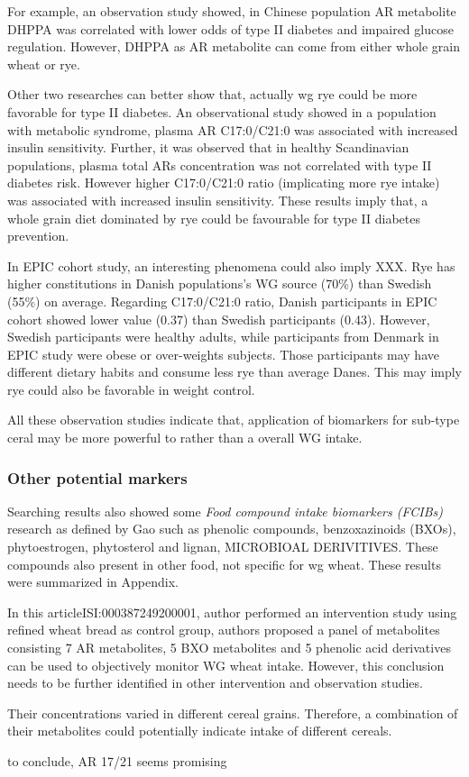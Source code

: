 For example, an observation study showed, in Chinese population AR metabolite DHPPA was correlated with lower odds of type II diabetes and impaired glucose regulation\cite{ISI:000430455900021}. However, DHPPA as AR metabolite can come from either whole grain wheat or rye.

Other two researches can better show that, actually \acrshort{wg} rye could be more favorable for type II diabetes.  An observational study showed in a population with metabolic syndrome, plasma AR C17:0/C21:0 was associated with increased insulin sensitivity\cite{ISI:000333777700008}. Further, it was observed that in healthy Scandinavian populations, plasma total ARs concentration was not correlated with type II diabetes risk. However higher C17:0/C21:0 ratio (implicating more rye intake) was associated with increased insulin sensitivity\cite{ISI:000378977200013}. These results imply that, a whole grain diet dominated by rye could be favourable for type II diabetes prevention. 

In EPIC cohort study, an interesting phenomena could also imply XXX. Rye has higher constitutions in Danish populations's WG source (70\%) than Swedish (55\%) on average. Regarding C17:0/C21:0 ratio, Danish participants in EPIC cohort showed lower value (0.37) than Swedish participants (0.43). 
However, Swedish participants were healthy adults, while participants from Denmark in EPIC study were obese or over-weights subjects. Those participants may have different dietary habits and consume less rye than average Danes. This may imply rye could also be favorable in weight control.

All these observation studies indicate that, application of biomarkers for sub-type ceral may be more powerful to rather than a overall WG intake.

\subsubsection{Other potential markers}
Searching results also showed some \textit{Food compound intake biomarkers (FCIBs)} research as defined by Gao\cite{Gao2017} such as phenolic compounds\cite{ISI:000389134200003}, benzoxazinoids (BXOs)\cite{ISI:000394168100034,ISI:000348343300015}, phytoestrogen\cite{ISI:000384082300001}, phytosterol and lignan\cite{ISI:000387249200001}, MICROBIOAL DERIVITIVES\cite{ISI:000348343300015}. These compounds also present in other food,  not specific for \acrshort{wg} wheat. These results were summarized in Appendix.

In this article{ISI:000387249200001}, author performed an intervention study using refined wheat bread as control group, authors proposed a panel of metabolites consisting 7 AR metabolites, 5 BXO metabolites and 5 phenolic acid derivatives can be used to objectively monitor WG wheat intake. However, this conclusion needs to be further identified in other intervention and observation studies.

Their concentrations varied in different cereal grains. Therefore, a combination of their metabolites could potentially indicate intake of different cereals.


to conclude, AR 17/21 seems promising 